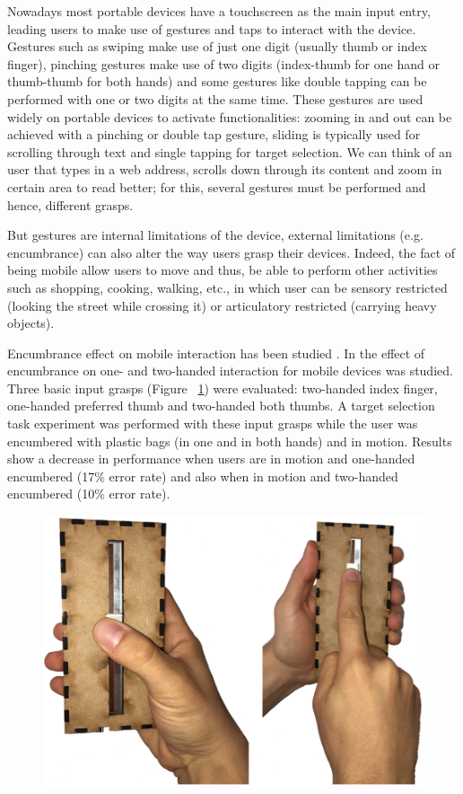 \documentclass{sigchi}
\begin{document}
Nowadays most portable devices have a touchscreen as the main input entry, leading users to make use of gestures and taps to interact with the device. Gestures such as swiping make use of just one digit (usually thumb or index finger), pinching gestures make use of two digits (index-thumb for one hand or thumb-thumb for both hands) and some gestures like double tapping can be performed with one or two digits at the same time. These gestures are used widely on portable devices to activate functionalities: zooming in and out can be achieved with a pinching or double tap gesture, sliding is typically used for scrolling through text and single tapping for target selection. We can think of an user that types in a web address, scrolls down through its content and zoom in certain area to read better; for this, several gestures must be performed and hence, different grasps.

But gestures are internal limitations of the device, external limitations (e.g. encumbrance) can also alter the way users grasp their devices. Indeed, the fact of being mobile allow users to move and thus, be able to perform other activities such as shopping, cooking, walking, etc., in which user can be sensory restricted (looking the street while crossing it) or articulatory restricted (carrying heavy objects).
 
Encumbrance effect on mobile interaction has been studied \cite{NgA11,Ng2013,Ng:2013:REW:2468356.2468599,Mainwaring2005}. In \cite{Ng:2014:IEE:2556288.2557312} the effect of encumbrance on one- and two-handed interaction for mobile devices was studied. Three basic input grasps (Figure ~\ref{fig:figure1}) were evaluated: two-handed index finger, one-handed preferred thumb and two-handed both thumbs. A target selection task experiment was performed with these input grasps while the user was encumbered with plastic bags (in one and in both hands) and in motion. Results show a decrease in performance when users are in motion and one-handed encumbered (17\% error rate) and also when in motion and two-handed encumbered (10\% error rate).

\begin{figure}[h]
\centering
  \includegraphics[scale=0.3]{figures/1}
  \caption{}
  \label{fig:figure1}
\end{figure}
\end{document}
